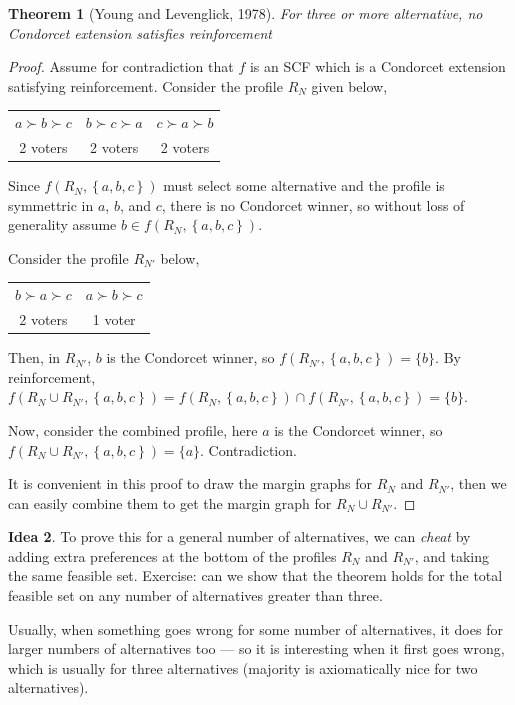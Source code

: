 \documentclass{book}
\theoremstyle{plain}
\newtheorem{theorem}{Theorem}[subsection]
\theoremstyle{definition}
\newtheorem{idea}[theorem]{Idea}
\theoremstyle{remark}
\newcommand{\set}[1]{\left\{#1\right\}}
\begin{document}
\begin{theorem}[Young and Levenglick, 1978]\label{t:Young-Levenglick}
    For three or more alternative, no Condorcet extension satisfies reinforcement
    
\end{theorem}
\begin{proof}
    Assume for contradiction that $f$ is an SCF which is 
    a Condorcet extension satisfying 
    reinforcement.
    Consider the profile $R_N$ given below,
    \begin{center}
    \begin{tabular}{c|c|c}
        $a \succ b \succ c$ & $b \succ c \succ a$ & $c \succ a \succ b$ \\
        2 voters & 2 voters & 2 voters
    \end{tabular}
    \end{center}
    Since $f(R_N, \set{a, b, c})$ must select 
    some alternative and the profile is symmettric in 
    $a$, $b$, and $c$, there is no Condorcet winner, 
    so without loss of generality assume 
    $b \in f(R_N, \set{a, b, c})$.

    Consider the profile $R_{N'}$ below,
    \begin{center}
    \begin{tabular}{c|c}
        $b \succ a \succ c$ & $a \succ b \succ c$ \\
        2 voters & 1 voter
    \end{tabular}
    \end{center}

    Then, in $R_{N'}$, $b$ is 
    the Condorcet winner, so $f(R_{N'}, \set{a, b, c}) = \{b\}$.
    By reinforcement, $f(R_N \cup R_{N'}, \set{a, b, c}) = f(R_N, \set{a, b, c}) \cap f(R_{N'}, \set{a, b, c}) = \{b\}$.
    
    Now, consider the combined profile, 
    here $a$ is the Condorcet winner, so 
    $f(R_N \cup R_{N'}, \set{a, b, c}) = \{a\}$.
    Contradiction.

    It is convenient in this proof to draw the 
    margin graphs for 
    $R_N$ and $R_{N'}$, then we can easily 
    combine them to get the 
    margin graph for $R_N \cup R_{N'}$.
\end{proof}

\begin{idea}
    To prove this for a general number of alternatives,
    we can \emph{cheat} by adding extra preferences at the bottom
    of the profiles $R_N$ and $R_{N'}$, and taking the same feasible set.
    Exercise: can we show that the theorem holds for the total 
    feasible set on any number of alternatives greater than three.

    Usually, when something goes wrong for some number of alternatives, 
    it does for larger numbers of alternatives too --- so it is interesting when it first goes wrong, 
    which is usually for three alternatives (majority is axiomatically nice for two alternatives).
\end{idea}
\end{document}
